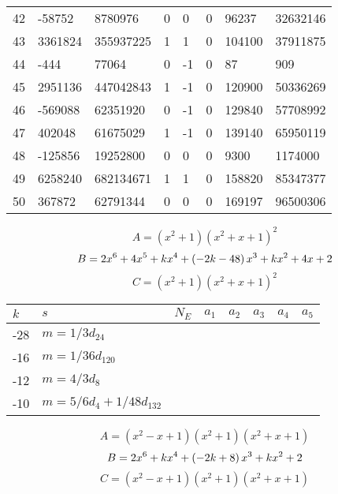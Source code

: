 \documentclass{amsart}
\begin{document}
\begin{longtable}{|l|l|l|lllll|}
42&-58752&8780976&0&0&0&96237&32632146\\
43&3361824&355937225&1&1&0&104100&37911875\\
44&-444&77064&0&-1&0&87&909\\
45&2951136&447042843&1&-1&0&120900&50336269\\
46&-569088&62351920&0&-1&0&129840&57708992\\
47&402048&61675029&1&-1&0&139140&65950119\\
48&-125856&19252800&0&0&0&9300&1174000\\
49&6258240&682134671&1&1&0&158820&85347377\\
50&367872&62791344&0&0&0&169197&96500306\\
\hline
\end{longtable}
$$A=(x^2
 + 1)(x^2
 + x
 + 1)^{2}$$
$$B=2\*x^6
 + 4\*x^5
 + k\*x^4
 + \left(-2\*k
 - 48\right) \*x^3
 + k\*x^2
 + 4\*x
 + 2$$
$$C=(x^2
 + 1)(x^2
 + x
 + 1)^{2}$$
\begin{longtable}{|l|l|l|lllll|}
\hline
$k$ & $s$ & $N_E$ & $a_1$ & $a_2$ & $a_3$ & $a_4$ & $a_5$\\
\hline
-28&$m=1/3d_{24}$&&\multicolumn{5}{c|}{}\\
-16&$m=1/36d_{120}$&&\multicolumn{5}{c|}{}\\
-12&$m=4/3d_{8}$&&\multicolumn{5}{c|}{}\\
-10&$m=5/6d_{4}+1/48d_{132}$&&\multicolumn{5}{c|}{}\\
\hline
\end{longtable}
$$A=(x^2
 - x
 + 1)(x^2
 + 1)(x^2
 + x
 + 1)$$
$$B=2\*x^6
 + k\*x^4
 + \left(-2\*k
 + 8\right) \*x^3
 + k\*x^2
 + 2$$
$$C=(x^2
 - x
 + 1)(x^2
 + 1)(x^2
 + x
 + 1)$$
\end{document}
